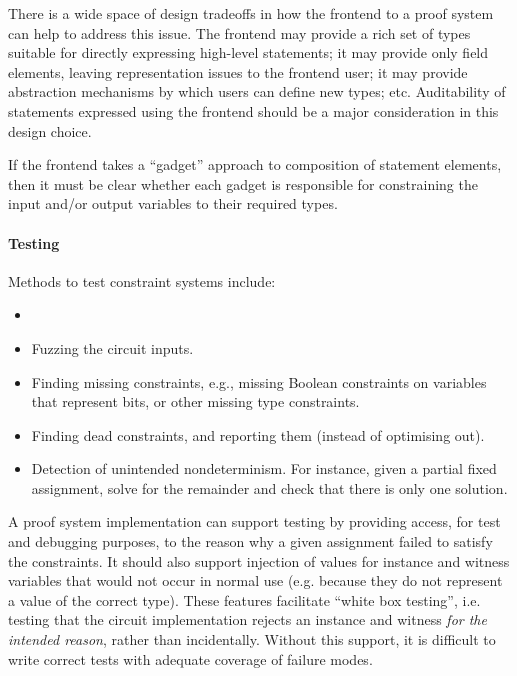 There is a wide space of design tradeoffs in how the frontend to a proof system can help to address this issue.
The frontend may provide a rich set of types suitable for directly expressing high-level statements; 
    it may provide only field elements, leaving representation issues to the frontend user; 
    it may provide abstraction mechanisms by which users can define new types; etc. 
Auditability of statements expressed using the frontend should be a major consideration in this design choice.

If the frontend takes a ``gadget'' approach to composition of statement elements, then it must be clear whether each gadget is responsible for constraining the input and/or output variables to their required types.


\paragraph{Testing}
Methods to test constraint systems include:
\begin{itemize}
    \item {}
    \item Fuzzing the circuit inputs.
    \item Finding missing constraints, e.g., missing Boolean constraints on variables that represent bits, or other missing type constraints.
    \item Finding dead constraints, and reporting them (instead of optimising out).
    \item Detection of unintended nondeterminism. For instance, given a partial fixed assignment, solve for the remainder and check that there is only one solution.
\end{itemize}

A proof system implementation can support testing by providing access, for test and debugging purposes, to the reason why a given assignment failed to satisfy the constraints.
It should also support injection of values for instance and witness variables that would not occur in normal use (e.g. because they do not represent a value of the correct type).
These features facilitate ``white box testing'', i.e. testing that the circuit implementation rejects an instance and witness \emph{for the intended reason}, rather than incidentally.
Without this support, it is difficult to write correct tests with adequate coverage of failure modes.


